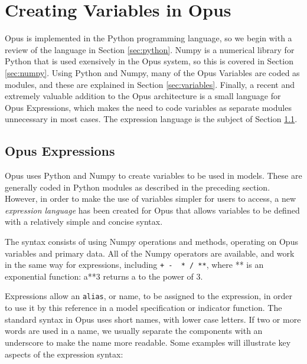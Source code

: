 \chapter{Creating Variables in Opus}
\label{chap:creating-variables}

Opus is implemented in the Python programming language, so we begin
with a review of the language in Section \ref{sec:python}. Numpy is a numerical library for Python that is used exensively in the
Opus system, so this is covered in Section \ref{sec:numpy}. Using
Python and Numpy, many of the Opus Variables are coded as modules, and
these are explained in Section \ref{sec:variables}.  Finally, a recent
and extremely valuable addition to the Opus architecture is a small
language for Opus Expressions, which makes the need to code variables
as separate modules unnecessary in most cases.  The expression language
is the subject of Section \ref{sec:expressions}.



\section{Opus Expressions}
\label{sec:expressions}

Opus uses Python and Numpy to create variables to be used in models.  These are generally coded in Python modules as
described in the preceding section.  However, in order to make the use of variables simpler for users to access, a new
\emph{expression language} has been created for Opus
that allows variables to be defined with a relatively simple and concise syntax.  

The syntax consists of using Numpy operations and methods, operating on Opus variables and primary data.  All of the Numpy operators are available, and work in the same way for expressions, including \verb#+ -  * / **#, where ** is an exponential function: a**3 returns a to the power of 3.

Expressions allow an \verb#alias#, or name, to be assigned to the expression, in order to use it by this reference in a model specification or indicator function.  The standard syntax in Opus uses short names, with lower case letters.  If two or more words are used in a name, we usually separate the components with an underscore to make the name more readable.  Some examples will illustrate key aspects of the expression syntax:

